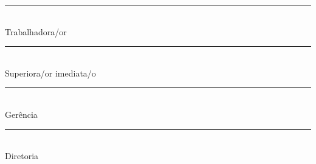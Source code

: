 \documentclass[openright, oneside, a4paper, article, brazil]{abntex2}
\begin{document}
        \noindent
\begin{minipage}{0.5\linewidth}
    \vspace*{5\baselineskip}\centering
    \rule{0.8\linewidth}{0.4pt}\\
    \tiny Trabalhadora/or 
    \vspace*{5\baselineskip}

    \rule{0.8\linewidth}{0.4pt}\\
    \tiny Superiora/or imediata/o
    \vfill
\end{minipage}%
\begin{minipage}{0.5\linewidth}
    \vspace*{5\baselineskip}\centering
    \rule{0.8\linewidth}{0.4pt}\\
    \tiny Gerência 
    \vspace*{5\baselineskip}

    \rule{0.8\linewidth}{0.4pt}\\
    \tiny Diretoria
    \vfill
\end{minipage}
\end{document}
